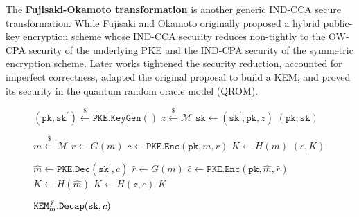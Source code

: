 \documentclass[journal=tches,submission]{iacrtrans}
\newcommand{\keygen}{\texttt{KeyGen}}
\newcommand{\kem}{\texttt{KEM}}
\newcommand{\encap}{\texttt{Encap}}
\newcommand{\decap}{\texttt{Decap}}
\newcommand{\pk}{\texttt{pk}}
\newcommand{\sk}{\texttt{sk}}
\newcommand{\leftsample}{\stackrel{\$}{\leftarrow}}
\begin{document}
The \textbf{Fujisaki-Okamoto transformation} \cite{DBLP:conf/crypto/FujisakiO99}\cite{DBLP:journals/joc/FujisakiO13} is another generic IND-CCA secure transformation. While Fujisaki and Okamoto originally proposed a hybrid public-key encryption scheme whose IND-CCA security reduces non-tightly to the OW-CPA security of the underlying PKE and the IND-CPA security of the symmetric encryption scheme. Later works \cite{DBLP:conf/ima/Dent03}\cite{DBLP:conf/tcc/HofheinzHK17}\cite{DBLP:conf/eurocrypt/DworkNR04}\cite{DBLP:conf/asiacrypt/HovelmannsHM22}\cite{bernstein2018towards}  tightened the security reduction, accounted for imperfect correctness, adapted the original proposal to build a KEM, and proved its security in the quantum random oracle model (QROM).

\begin{figure}[h]
    \centering

    \begin{minipage}[t]{0.34\textwidth}
        \begin{algorithm}[H]
            \caption*{$\kem^{\not\bot}_m.\keygen()$}
            \begin{algorithmic}[1]
                \State $(\pk, \sk^\prime) \leftsample \texttt{PKE.KeyGen}()$
                \State $z \leftsample \mathcal{M}$
                \State $\sk \leftarrow (\sk^\prime, \pk, z)$
                \State \Return $(\pk, \sk)$
            \end{algorithmic}
        \end{algorithm}
    \end{minipage}
    \begin{minipage}[t]{0.3\textwidth}
        \begin{algorithm}[H]
            \caption*{$\kem^{\not\bot}_m.\encap(\pk)$}
            \begin{algorithmic}[1]
                \State $m \leftsample \mathcal{M}$
                \State $r \leftarrow G(m)$
                \State $c \leftarrow \texttt{PKE.Enc}(\pk, m ,r)$
                \State $K \leftarrow H(m)$
                \State \Return $(c, K)$
            \end{algorithmic}
        \end{algorithm}
    \end{minipage}
    \begin{minipage}[t]{0.3\textwidth}
        \begin{algorithm}[H]
            \caption*{$\kem^{\not\bot}_m.\decap(\sk, c)$}
            \begin{algorithmic}[1]
                \State $\hat{m} \leftarrow \texttt{PKE.Dec}(\sk^\prime, c)$
                \State $\hat{r} \leftarrow G(m)$
                \State $\hat{c} \leftarrow \texttt{PKE.Enc}(\pk, \hat{m}, \hat{r})$
                    \State $K \leftarrow H(\hat{m})$
                \Else
                    \State $K \leftarrow H(z, c)$
                \EndIf
                \State \Return $K$
            \end{algorithmic}
        \end{algorithm}
    \end{minipage}


\end{figure}
\end{document}

